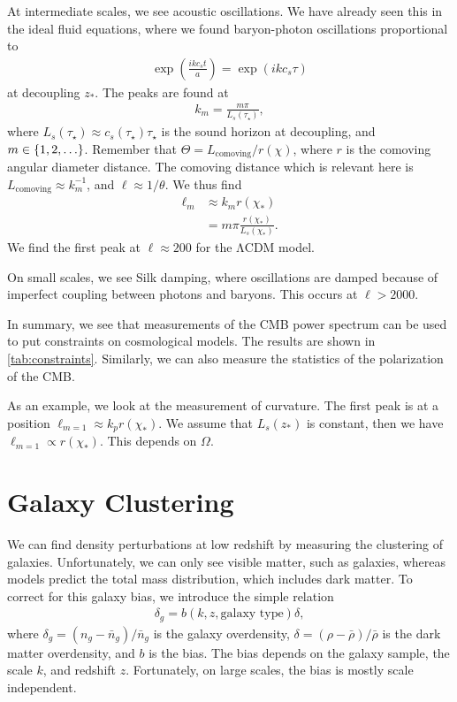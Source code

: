 At intermediate scales, we see acoustic oscillations. We have already seen this in the ideal fluid equations, where we found baryon-photon oscillations proportional to
\begin{align*}
	\exp(\frac{i k c_s t}{a})
	= \exp(i k c_s \tau)
\end{align*}
at decoupling $z_*$. The peaks are found at
\begin{align*}
	k_m = \frac{m \pi}{L_s(\tau_\star)},
\end{align*}
where $L_s(\tau_\star) \approx c_s(\tau_\star) \tau_\star$ is the sound horizon at decoupling, and $m \in \left\{ {1, 2, \dots} \right\}$.
Remember that $\Theta = L_\text{comoving} / r(\chi)$, where $r$ is the comoving angular diameter distance. The comoving distance which is relevant here is $L_\text{comoving} \approx k_m^{-1}$, and $\ell \approx 1/\theta$. We thus find
\begin{align*}
	\ell_m 
	&\approx k_m r(\chi_*)\\
	&= m \pi \frac{r(\chi_*)}{L_s(\chi_*)}.
\end{align*}
We find the first peak at $\ell \approx 200$ for the ΛCDM model.

On small scales, we see Silk damping, where oscillations are damped because of imperfect coupling between photons and baryons. This occurs at $\ell > 2000$.

In summary, we see that measurements of the CMB power spectrum can be used to put constraints on cosmological models. The results are shown in \cref{tab:constraints}. Similarly, we can also measure the statistics of the polarization of the CMB.


As an example, we look at the measurement of curvature. The first peak is at a position $\ell_{m=1} \approx k_p r(\chi_*)$. We assume that $L_s(z_*)$ is constant, then we have $\ell_{m=1} \propto r(\chi_*)$. This depends on $\Omega$.






\section{Galaxy Clustering}

We can find density perturbations at low redshift by measuring the clustering of galaxies. Unfortunately, we can only see visible matter, such as galaxies, whereas models predict the total mass distribution, which includes dark matter. To correct for this galaxy bias, we introduce the simple relation
\begin{align*}
	\delta_g = b(k, z, \text{galaxy type}) \delta,
\end{align*}
where
$\delta_g = (n_g - \bar{n}_g)/\bar{n}_g$ is the galaxy overdensity,
$\delta = (\rho-\bar{\rho})/\bar{\rho}$ is the dark matter overdensity,
and $b$ is the bias.
The bias depends on the galaxy sample, the scale $k$, and redshift $z$. Fortunately, on large scales, the bias is mostly scale independent.

